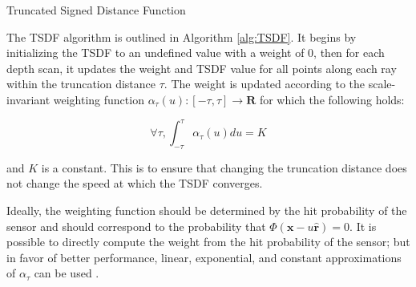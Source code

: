 \documentclass[10pt,twocolumn,letterpaper]{article}
\begin{document}
\begin{algorithm}[t!]
	\caption{Truncated Signed Distance Function}
	\label{alg:TSDF}
	\begin{algorithmic}[1]
		 
			 
				 
				\label{alg:line:dynamic_tsdf}
			     
				    	\label{alg:line:voxel_carve}
					\EndIf
			    \EndFor
				 		 
					\label{alg:line:tsdf_update}
				\EndFor
			\EndFor
		\EndFor
	\end{algorithmic}
\end{algorithm}

The TSDF algorithm is outlined in Algorithm \ref{alg:TSDF}. It begins by
initializing the TSDF to an undefined value with a weight of $0$, then for each
depth scan, it updates the weight and TSDF value for all points along each ray
within the truncation distance $\tau$. The weight is updated according
to the scale-invariant weighting function $\alpha_{\tau}(u) : [-\tau,\tau]\to
\mathbf{R} $ for which the following holds:

\begin{equation}
	\forall \tau, \int_{-\tau}^{\tau} \alpha_{\tau}(u) du = K 
\end{equation}
 
 \noindent and $K$ is a constant. This is to ensure that changing the truncation
 distance does not change the speed at which the TSDF converges.  
 
Ideally, the weighting function should be determined by the hit probability of
the sensor and should correspond to the probability that $\Phi(\mathbf{x} - u
\mathbf{\hat{r}}) = 0$. It is possible \cite{Nguyen2012} to
directly compute the weight from the hit probability of the sensor; but in favor
of better performance, linear, exponential, and constant approximations of
$\alpha_{\tau}$ can be used \cite{Curless1996, Newcombe, Whelan2013, Bylow2013}.
\end{document}
